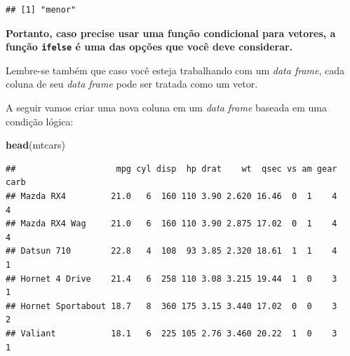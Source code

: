 \documentclass[
]{book}
\newenvironment{Shaded}{\begin{snugshade}}{\end{snugshade}}
\newcommand{\CommentTok}[1]{\textcolor[rgb]{0.56,0.35,0.01}{\textit{#1}}}
\newcommand{\DecValTok}[1]{\textcolor[rgb]{0.00,0.00,0.81}{#1}}
\newcommand{\KeywordTok}[1]{\textcolor[rgb]{0.13,0.29,0.53}{\textbf{#1}}}
\newcommand{\NormalTok}[1]{#1}
\newcommand{\OperatorTok}[1]{\textcolor[rgb]{0.81,0.36,0.00}{\textbf{#1}}}
\newcommand{\StringTok}[1]{\textcolor[rgb]{0.31,0.60,0.02}{#1}}
\begin{document}
\begin{verbatim}
## [1] "menor"
\end{verbatim}

\textbf{Portanto, caso precise usar uma função condicional para vetores,
a função \texttt{ifelse} é uma das opções que você deve considerar.}

Lembre-se também que caso você esteja trabalhando com um \emph{data
frame}, cada coluna de seu \emph{data frame} pode ser tratada como um
vetor.

A seguir vamos criar uma nova coluna em um \emph{data frame} baseada em
uma condição lógica:

\begin{Shaded}
\begin{Highlighting}[]
\KeywordTok{head}\NormalTok{(mtcars)}
\end{Highlighting}
\end{Shaded}

\begin{verbatim}
##                    mpg cyl disp  hp drat    wt  qsec vs am gear carb
## Mazda RX4         21.0   6  160 110 3.90 2.620 16.46  0  1    4    4
## Mazda RX4 Wag     21.0   6  160 110 3.90 2.875 17.02  0  1    4    4
## Datsun 710        22.8   4  108  93 3.85 2.320 18.61  1  1    4    1
## Hornet 4 Drive    21.4   6  258 110 3.08 3.215 19.44  1  0    3    1
## Hornet Sportabout 18.7   8  360 175 3.15 3.440 17.02  0  0    3    2
## Valiant           18.1   6  225 105 2.76 3.460 20.22  1  0    3    1
\end{verbatim}

\begin{Shaded}
\end{Shaded}
\end{document}
